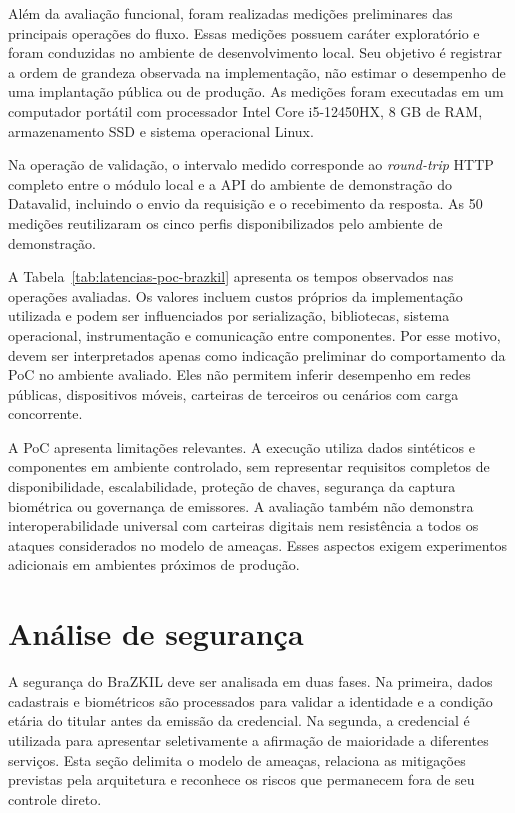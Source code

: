 \documentclass[12pt]{article}
\begin{document}
Além da avaliação funcional, foram realizadas medições preliminares das principais operações do fluxo. Essas medições possuem caráter exploratório e foram conduzidas no ambiente de desenvolvimento local. Seu objetivo é registrar a ordem de grandeza observada na implementação, não estimar o desempenho de uma implantação pública ou de produção. As medições foram executadas em um computador portátil com processador Intel Core i5-12450HX, 8 GB de RAM, armazenamento SSD e sistema operacional Linux.

Na operação de validação, o intervalo medido corresponde ao \textit{round-trip} HTTP completo entre o módulo local e a API do ambiente de demonstração do Datavalid, incluindo o envio da requisição e o recebimento da resposta. As 50 medições reutilizaram os cinco perfis disponibilizados pelo ambiente de demonstração.



A Tabela~\ref{tab:latencias-poc-brazkil} apresenta os tempos observados nas operações avaliadas. Os valores incluem custos próprios da implementação utilizada e podem ser influenciados por serialização, bibliotecas, sistema operacional, instrumentação e comunicação entre componentes. Por esse motivo, devem ser interpretados apenas como indicação preliminar do comportamento da PoC no ambiente avaliado. Eles não permitem inferir desempenho em redes públicas, dispositivos móveis, carteiras de terceiros ou cenários com carga concorrente.

A PoC apresenta limitações relevantes. A execução utiliza dados sintéticos e componentes em ambiente controlado, sem representar requisitos completos de disponibilidade, escalabilidade, proteção de chaves, segurança da captura biométrica ou governança de emissores. A avaliação também não demonstra interoperabilidade universal com carteiras digitais nem resistência a todos os ataques considerados no modelo de ameaças. Esses aspectos exigem experimentos adicionais em ambientes próximos de produção.
\section{Análise de segurança}
\label{sec:analise-seguranca}

A segurança do BraZKIL deve ser analisada em duas fases. Na primeira, dados cadastrais e biométricos são processados para validar a identidade e a condição etária do titular antes da emissão da credencial. Na segunda, a credencial é utilizada para apresentar seletivamente a afirmação de maioridade a diferentes serviços. Esta seção delimita o modelo de ameaças, relaciona as mitigações previstas pela arquitetura e reconhece os riscos que permanecem fora de seu controle direto.
\end{document}
